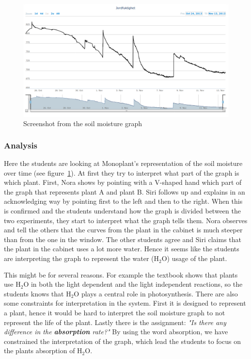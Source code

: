 \begin{figure}
	\centering
	\includegraphics[width=1.0\textwidth]{img/dataandanalasys/soilmoisturegraph.png}
	\caption{Screenshot from the soil moisture graph}
	\label{fig:soilmoistscreenshot}
\end{figure}

\subsubsection*{Analysis}
Here the students are looking at Monoplant's representation of the soil moisture over time (see figure~\ref{fig:soilmoistscreenshot}). At first they try to interpret what part of the graph is which plant. First, Nora shows by pointing with a V-shaped hand which part of the graph that represents plant A and plant B. Siri follows up and explains in an acknowledging way by pointing first to the left and then to the right. When this is confirmed and the students understand how the graph is divided between the two experiments, they start to interpret what the graph tells them. Nora observes and tell the others that the curves from the plant in the cabinet is much steeper than from the one in the window. The other students agree and Siri claims that the plant in the cabinet uses a lot more water. Hence it seems like the students are interpreting the graph to represent the water ($\text{H}_2\text{O}$) usage of the plant. 

This might be for several reasons. For example the textbook shows that plants use $\text{H}_2\text{O}$ in both the light dependent and the light independent reactions, so the students knows that $\text{H}_2\text{O}$ plays a central role in photosynthesis. There are also some constraints for interpretation in the system. First it is designed to represent a plant, hence it would be hard to interpret the soil moisture graph to not represent the life of the plant. Lastly there is the assignment: \emph{"Is there any difference in the \textbf{absorption} rate?"} By using the word absorption, we have constrained the interpretation of the graph, which lead the students to focus on the plants absorption of $\text{H}_2\text{O}$.
